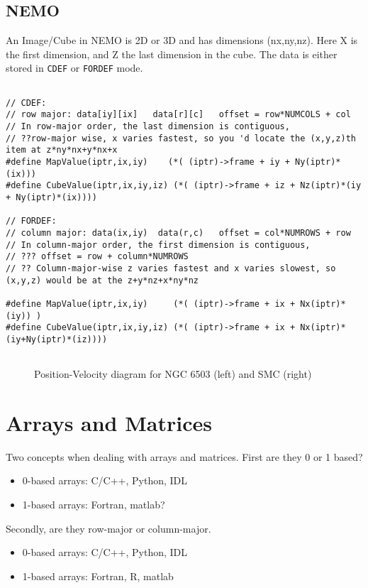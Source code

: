 \documentclass[preprint]{aastex} %
\begin{document}
\subsection{NEMO}

An Image/Cube in NEMO is 2D or 3D and has dimensions (nx,ny,nz). Here 
X is the first dimension, and Z the last dimension in the cube.
The data is either stored in {\tt CDEF} or {\tt FORDEF} mode.



\footnotesize
\begin{verbatim}

// CDEF:
// row major: data[iy][ix]   data[r][c]   offset = row*NUMCOLS + col 
// In row-major order, the last dimension is contiguous,
// ??row-major wise, x varies fastest, so you 'd locate the (x,y,z)th item at z*ny*nx+y*nx+x
#define MapValue(iptr,ix,iy)	(*( (iptr)->frame + iy + Ny(iptr)*(ix)))
#define CubeValue(iptr,ix,iy,iz) (*( (iptr)->frame + iz + Nz(iptr)*(iy + Ny(iptr)*(ix))))

// FORDEF:
// column major: data(ix,iy)  data(r,c)   offset = col*NUMROWS + row
// In column-major order, the first dimension is contiguous,
// ??? offset = row + column*NUMROWS 
// ?? Column-major-wise z varies fastest and x varies slowest, so (x,y,z) would be at the z+y*nz+x*ny*nz 

#define MapValue(iptr,ix,iy)	 (*( (iptr)->frame + ix + Nx(iptr)*(iy)) )
#define CubeValue(iptr,ix,iy,iz) (*( (iptr)->frame + ix + Nx(iptr)*(iy+Ny(iptr)*(iz))))


\end{verbatim}
\normalsize



\begin{figure}
\caption{Position-Velocity diagram for NGC 6503 (left) and SMC (right)}
\label{fig:pv1}
\end{figure}


\section{Arrays and Matrices}

Two concepts when dealing with arrays and matrices. First are they 0 or 1 based?

\begin{itemize}
\item
0-based arrays:   C/C++,  Python, IDL
\item
1-based arrays:   Fortran, matlab?
\end{itemize}

Secondly, are they row-major or column-major.


\begin{itemize}
\item  
0-based arrays:   C/C++,  Python, IDL
\item
1-based arrays:   Fortran, R, matlab
\end{itemize}
\end{document}
